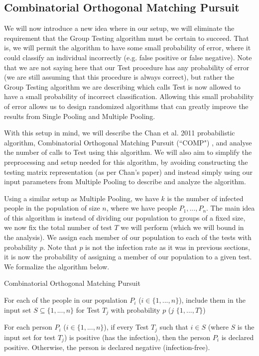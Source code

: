 \documentclass[12pt]{article}
\begin{document}
\subsection{Combinatorial Orthogonal Matching Pursuit}
We will now introduce a new idea where in our setup, we will eliminate the requirement that the Group Testing algorithm must be certain to succeed. That is, we will permit the algorithm to have some small probability of error, where it could classify an individual incorrectly (e.g. false positive or false negative). Note that we are not saying here that our {\sf Test} procedure has any probability of error (we are still assuming that this procedure is always correct), but rather the Group Testing algorithm we are describing which calls {\sf Test} is now allowed to have a small probability of incorrect classification. Allowing this small probability of error allows us to design randomized algorithms that can greatly improve the results from Single Pooling and Multiple Pooling.

With this setup in mind, we will describe the Chan et al. 2011 probabilistic algorithm, Combinatorial Orthogonal Matching Pursuit (``COMP") \cite{chan}, and analyse the number of calls to {\sf Test} using this algorithm. We will also aim to simplify the preprocessing and setup needed for this algorithm, by avoiding constructing the testing matrix representation (as per Chan's paper) and instead simply using our input parameters from Multiple Pooling to describe and analyze the algorithm.

Using a similar setup as Multiple Pooling, we have $k$ is the number of infected people in the population of size $n$, where we have people $P_1,...,P_n$. The main idea of this algorithm is instead of dividing our population to groups of a fixed size, we now fix the total number of test $T$ we will perform (which we will bound in the analysis). We assign each member of our population to each of the tests with probability $p$. Note that $p$ is not the infection rate as it was in previous sections, it is now the probability of assigning a member of our population to a given test. We formalize the algorithm below.

\LinesNumbered
\begin{algorithm}[ht]
  \caption{Combinatorial Orthogonal Matching Pursuit\label{alg}}
  For each of the people in our population $P_i$ ($i \in \{1,...,n\}$), include them in the input set $S \subseteq \{1,...,n\}$ for Test $T_j$ with probability $p$ (\forall $j$ \in $\{1,...,T\}$)
  
  For each person $P_i$ ($i \in \{1,...,n\}$), if every Test $T_j$ such that $i \in S$ (where $S$ is the input set for test $T_j$) is positive (has the infection), then the person $P_i$ is declared positive. Otherwise, the person is declared negative (infection-free).
 
\end{algorithm}
\end{document}
